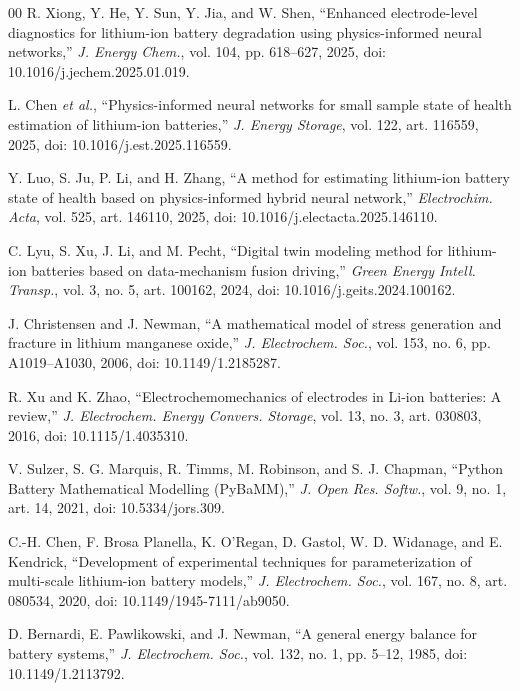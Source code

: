 \documentclass[conference]{IEEEtran}
\begin{document}
\begin{thebibliography}{00}
R. Xiong, Y. He, Y. Sun, Y. Jia, and W. Shen, ``Enhanced electrode-level diagnostics for lithium-ion battery degradation using physics-informed neural networks,'' \emph{J. Energy Chem.}, vol. 104, pp. 618--627, 2025, doi: 10.1016/j.jechem.2025.01.019.

L. Chen \emph{et al.}, ``Physics-informed neural networks for small sample state of health estimation of lithium-ion batteries,'' \emph{J. Energy Storage}, vol. 122, art. 116559, 2025, doi: 10.1016/j.est.2025.116559.

Y. Luo, S. Ju, P. Li, and H. Zhang, ``A method for estimating lithium-ion battery state of health based on physics-informed hybrid neural network,'' \emph{Electrochim. Acta}, vol. 525, art. 146110, 2025, doi: 10.1016/j.electacta.2025.146110.

C. Lyu, S. Xu, J. Li, and M. Pecht, ``Digital twin modeling method for lithium-ion batteries based on data-mechanism fusion driving,'' \emph{Green Energy Intell. Transp.}, vol. 3, no. 5, art. 100162, 2024, doi: 10.1016/j.geits.2024.100162.

J. Christensen and J. Newman, ``A mathematical model of stress generation and fracture in lithium manganese oxide,'' \emph{J. Electrochem. Soc.}, vol. 153, no. 6, pp. A1019--A1030, 2006, doi: 10.1149/1.2185287.

R. Xu and K. Zhao, ``Electrochemomechanics of electrodes in Li-ion batteries: A review,'' \emph{J. Electrochem. Energy Convers. Storage}, vol. 13, no. 3, art. 030803, 2016, doi: 10.1115/1.4035310.

V. Sulzer, S. G. Marquis, R. Timms, M. Robinson, and S. J. Chapman, ``Python Battery Mathematical Modelling (PyBaMM),'' \emph{J. Open Res. Softw.}, vol. 9, no. 1, art. 14, 2021, doi: 10.5334/jors.309.

C.-H. Chen, F. Brosa Planella, K. O'Regan, D. Gastol, W. D. Widanage, and E. Kendrick, ``Development of experimental techniques for parameterization of multi-scale lithium-ion battery models,'' \emph{J. Electrochem. Soc.}, vol. 167, no. 8, art. 080534, 2020, doi: 10.1149/1945-7111/ab9050.

D. Bernardi, E. Pawlikowski, and J. Newman, ``A general energy balance for battery systems,'' \emph{J. Electrochem. Soc.}, vol. 132, no. 1, pp. 5--12, 1985, doi: 10.1149/1.2113792.

\end{thebibliography}
\end{document}
